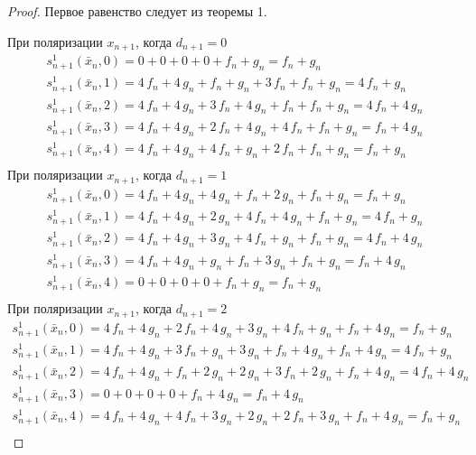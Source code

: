\documentclass[a4paper, 12pt]{article}
\begin{document}
 \begin{proof}

Первое равенство следует из теоремы 1.

При поляризации $x_{n+1}$, когда $d_{n+1} = 0$
$$\begin{array}{l}
s_{n+1}^1(\bar{x}_n, 0) = 0 + 0 + 0 + 0 + f_n + g_n = f_n + g_n \\
s_{n+1}^1(\bar{x}_n, 1) = 4\,f_n + 4\,g_n + f_n + g_n + 3\,f_n + f_n + g_n = 4\,f_n + g_n \\
s_{n+1}^1(\bar{x}_n, 2) = 4\,f_n + 4\,g_n + 3\,f_n + 4\,g_n + f_n + f_n + g_n = 4\,f_n + 4\,g_n \\
s_{n+1}^1(\bar{x}_n, 3) = 4\,f_n + 4\,g_n + 2\,f_n + 4\,g_n + 4\,f_n + f_n + g_n = f_n + 4\,g_n \\
s_{n+1}^1(\bar{x}_n, 4) = 4\,f_n + 4\,g_n + 4\,f_n + g_n + 2\,f_n + f_n + g_n = f_n + g_n \\
\end{array}$$
При поляризации $x_{n+1}$, когда $d_{n+1} = 1$
$$\begin{array}{l}
s_{n+1}^1(\bar{x}_n, 0) = 4\,f_n + 4\,g_n + 4\,g_n + f_n + 2\,g_n + f_n + g_n = f_n + g_n \\
s_{n+1}^1(\bar{x}_n, 1) = 4\,f_n + 4\,g_n + 2\,g_n + 4\,f_n + 4\,g_n + f_n + g_n = 4\,f_n + g_n \\
s_{n+1}^1(\bar{x}_n, 2) = 4\,f_n + 4\,g_n + 3\,g_n + 4\,f_n + g_n + f_n + g_n = 4\,f_n + 4\,g_n \\
s_{n+1}^1(\bar{x}_n, 3) = 4\,f_n + 4\,g_n + g_n + f_n + 3\,g_n + f_n + g_n = f_n + 4\,g_n \\
s_{n+1}^1(\bar{x}_n, 4) = 0 + 0 + 0 + 0 + f_n + g_n = f_n + g_n \\
\end{array}$$
При поляризации $x_{n+1}$, когда $d_{n+1} = 2$
$$\begin{array}{l}
s_{n+1}^1(\bar{x}_n, 0) = 4\,f_n + 4\,g_n + 2\,f_n + 4\,g_n + 3\,g_n + 4\,f_n + g_n + f_n + 4\,g_n = f_n + g_n \\
s_{n+1}^1(\bar{x}_n, 1) = 4\,f_n + 4\,g_n + 3\,f_n + g_n + 3\,g_n + f_n + 4\,g_n + f_n + 4\,g_n = 4\,f_n + g_n \\
s_{n+1}^1(\bar{x}_n, 2) = 4\,f_n + 4\,g_n + f_n + 2\,g_n + 2\,g_n + 3\,f_n + 2\,g_n + f_n + 4\,g_n = 4\,f_n + 4\,g_n \\
s_{n+1}^1(\bar{x}_n, 3) = 0 + 0 + 0 + 0 + f_n + 4\,g_n = f_n + 4\,g_n \\
s_{n+1}^1(\bar{x}_n, 4) = 4\,f_n + 4\,g_n + 4\,f_n + 3\,g_n + 2\,g_n + 2\,f_n + 3\,g_n + f_n + 4\,g_n = f_n + g_n \\

\end{array}$$
\end{proof}
\end{document}
